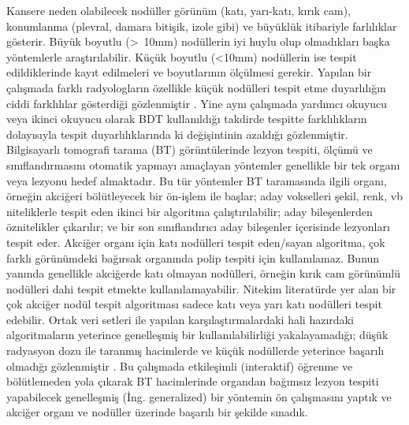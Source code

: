 \documentclass[conference]{IEEEtran}
\begin{document}
Kansere neden olabilecek nodüller görünüm (katı, yarı-katı, kırık cam), konumlanma (plevral, damara bitişik, izole gibi) ve büyüklük itibariyle farlılıklar gösterir. Büyük boyutlu (>~10mm) nodüllerin iyi huylu olup olmadıkları başka yöntemlerle araştırılabilir. Küçük boyutlu (<10mm) nodüllerin ise tespit edildiklerinde kayıt edilmeleri ve boyutlarının ölçülmesi gerekir. Yapılan bir çalışmada farklı radyologların özellikle küçük nodülleri tespit etme duyarlılığın ciddi farklılılar gösterdiği gözlenmiştir \cite{rubin2015}. Yine aynı çalışmada yardımcı okuyucu veya ikinci okuyucu olarak BDT kullanıldığı takdirde tespitte farklılıkların dolayısıyla tespit duyarlılıklarında ki değişintinin azaldığı gözlenmiştir. Bilgisayarlı tomografi tarama (BT) görüntülerinde lezyon tespiti, ölçümü ve sınıflandırmasını otomatik yapmayı amaçlayan yöntemler genellikle bir tek organı veya lezyonu hedef almaktadır. Bu tür yöntemler BT taramasında ilgili organı, örneğin akciğeri bölütleyecek bir ön-işlem ile başlar; aday vokselleri şekil, renk, vb niteliklerle tespit eden ikinci bir algoritma çalıştırılabilir; aday bileşenlerden öznitelikler çıkarılır; ve bir son sınıflandırıcı aday bileşenler içerisinde lezyonları tespit eder. Akciğer organı için katı nodülleri tespit eden/sayan algoritma, çok farklı görünümdeki bağırsak organında polip tespiti için kullanılamaz. Bunun yanında genellikle akciğerde katı olmayan nodülleri, örneğin kırık cam görünümlü nodülleri dahi tespit etmekte kullanılamayabilir. Nitekim literatürde yer alan bir çok akciğer nodül tespit algoritması sadece katı veya yarı katı nodülleri tespit edebilir. Ortak veri setleri ile yapılan karşılaştırmalardaki hali hazırdaki algoritmaların yeterince genelleşmiş bir kullanılabilirliği yakalayamadığı; düşük radyasyon dozu ile taranmış hacimlerde ve küçük nodüllerde yeterince başarılı olmadığı gözlenmiştir \cite{anode09}. Bu çalışmada etkileşimli (interaktif) öğrenme ve bölütlemeden yola çıkarak BT hacimlerinde organdan bağımsız lezyon tespiti yapabilecek genelleşmiş (İng. generalized) bir yöntemin ön çalışmasını yaptık ve akciğer organı ve nodüller üzerinde başarılı bir şekilde sınadık. 
\end{document}
